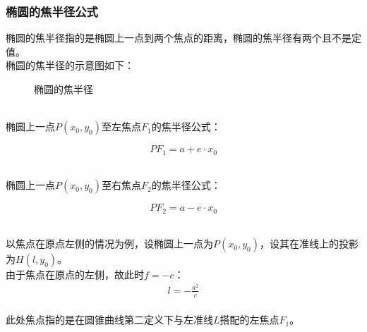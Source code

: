 \documentclass[UTF8]{ctexart}
\begin{document}
\subsubsection{椭圆的焦半径公式}
    椭圆的焦半径指的是椭圆上一点到两个焦点的距离，椭圆的焦半径有两个且不是定值。\\[3mm]
    椭圆的焦半径的示意图如下：
    \setcounter{equation}{0}
    \begin{figure}[h]
        \begin{center}
            \caption{椭圆的焦半径}
        \end{center}
    \end{figure}\\
    椭圆上一点$P(x_0,y_0)$至左焦点$F_1$的焦半径公式：
    \begin{large}
        \begin{equation*}
            PF_1=a+e\cdot x_0
        \end{equation*}
    \end{large}\\
    椭圆上一点$P(x_0,y_0)$至右焦点$F_2$的焦半径公式：
    \begin{large}
        \begin{equation*}
            PF_2=a-e\cdot x_0
        \end{equation*}
    \end{large}\\
    以焦点在原点左侧的情况为例，设椭圆上一点为$P(x_0,y_0)$，设其在准线上的投影为$H(l,y_0)$。\\[3mm]
    由于焦点在原点的左侧，故此时$f=-c$：
    \begin{align}
        l=-\frac{a^2}{c}
    \end{align}\\
    此处焦点指的是在圆锥曲线第二定义下与左准线$L$搭配的左焦点$F_1$。
\end{document}
